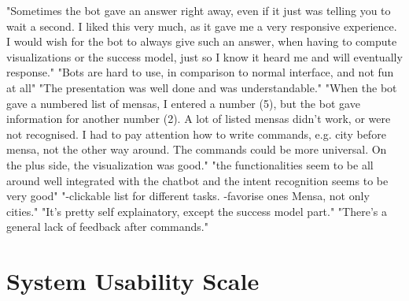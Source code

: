 \begin{appendices}
\bigbreak
"Sometimes the bot gave an answer right away, even if it just was telling you to wait a second. I liked this very much, as it gave me a very responsive experience. I would wish for the bot to always give such an answer, when having to compute visualizations or the success model, just so I know it heard me and will eventually response."
\bigbreak
"Bots are hard to use, in comparison to normal interface, and not fun at all"
\bigbreak
"The presentation was well done and was understandable."
\bigbreak
"When the bot gave a numbered list of mensas, I entered a number  (5), but the bot gave information for another number (2).
A lot of listed mensas didn't work, or were not recognised.
I had to pay attention how to write commands, e.g. city before mensa, not the other way around. The commands could be more universal.
On the plus side, the visualization was good."
\bigbreak
"the functionalities seem to be all around well integrated with the chatbot and the intent recognition seems to be very good"
\bigbreak
"-clickable list for different tasks.\newline
-favorise ones Mensa, not only cities."
\bigbreak
"It's pretty self explainatory, except the success model part."
\bigbreak
"There's a general lack of feedback after commands."

\section{System Usability Scale}

\end{appendices}
